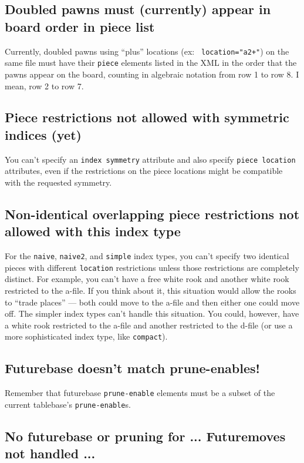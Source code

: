 \documentclass[11pt]{article}
\begin{document}
\subsection{Doubled pawns must (currently) appear in board order in piece list}

Currently, doubled pawns using ``plus'' locations (ex: {\tt
location="a2+"}) on the same file must have their {\tt piece} elements
listed in the XML in the order that the pawns appear on the board,
counting in algebraic notation from row 1 to row 8.  I mean, row 2 to
row 7.

\subsection{Piece restrictions not allowed with symmetric indices (yet)}

You can't specify an {\tt index symmetry} attribute and also specify
{\tt piece location} attributes, even if the restrictions on the piece
locations might be compatible with the requested symmetry.

\subsection{Non-identical overlapping piece restrictions not allowed with this index type}

For the {\tt naive}, {\tt naive2}, and {\tt simple} index types, you
can't specify two identical pieces with different {\tt location}
restrictions unless those restrictions are completely distinct.  For
example, you can't have a free white rook and another white rook
restricted to the a-file.  If you think about it, this situation would
allow the rooks to ``trade places'' --- both could move to the a-file
and then either one could move off.  The simpler index types can't
handle this situation.  You could, however, have a white rook
restricted to the a-file and another restricted to the d-file (or use
a more sophisticated index type, like {\tt compact}).

\subsection{Futurebase doesn't match prune-enables!}

Remember that futurebase {\tt prune-enable} elements must be a
subset of the current tablebase's {\tt prune-enable}s.


\subsection{No futurebase or pruning for ... \hfil\break Futuremoves not handled ...}
\end{document}
